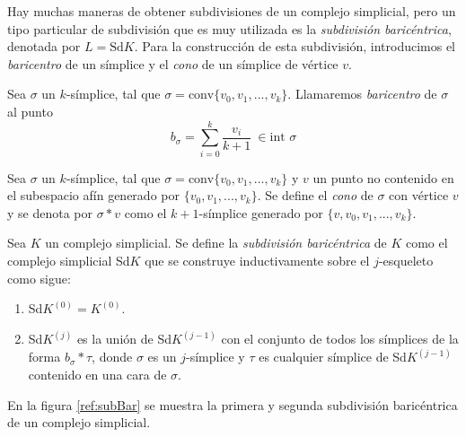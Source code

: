 Hay muchas maneras de obtener subdivisiones de un complejo simplicial, pero un tipo particular de subdivisión que es muy utilizada es la \emph{subdivisión baricéntrica}, denotada por $L = \text{Sd}K$. Para la construcción de esta subdivisión, introducimos el \emph{baricentro} de un símplice y el \emph{cono} de un símplice de vértice $v$.

\begin{definition}
Sea $\sigma$ un $k$-símplice, tal que $\sigma = \text{conv}\{v_0, v_1, ..., v_k\}$. Llamaremos \emph{baricentro} de $\sigma$ al punto
\[
b_\sigma = \sum_{i=0}^{k} \frac{v_i}{k+1}\ \in \text{int }\sigma
\]
\end{definition}

\begin{definition}
Sea $\sigma$ un $k$-símplice, tal que $\sigma = \text{conv}\{v_0, v_1, ..., v_k\}$ y $v$ un punto no contenido en el subespacio afín generado por $\{v_0, v_1, ..., v_k\}$. Se define el \emph{cono} de $\sigma$ con vértice $v$ y se denota por $\sigma*v$ como el $k+1$-símplice generado por $\{v,v_0, v_1, ..., v_k\}$.
\end{definition}

\begin{definition}
Sea $K$ un complejo simplicial. Se define la \emph{subdivisión baricéntrica} de $K$ como el complejo simplicial Sd$K$ que se construye inductivamente sobre el $j$-esqueleto como sigue:
\begin{enumerate}
	\item Sd$K^{(0)} = K^{(0)}$.
	\item Sd$K^{(j)}$ es la unión de Sd$K^{(j-1)}$ con el conjunto de todos los símplices de la forma $b_\sigma*\tau$, donde $\sigma$ es un $j$-símplice y $\tau$ es cualquier símplice de Sd$K^{(j-1)}$ contenido en una cara de $\sigma$.
\end{enumerate}
\end{definition}
En la figura \ref{ref:subBar} se muestra la primera y segunda subdivisión baricéntrica de un complejo simplicial.

